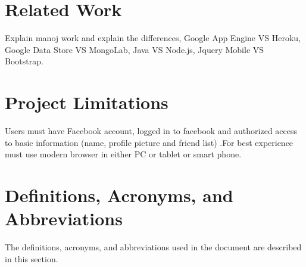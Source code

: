 \section{Related Work}
Explain manoj work and explain the differences, Google App Engine VS Heroku, Google Data Store VS MongoLab, Java VS Node.js, Jquery Mobile VS Bootstrap. \cite{Manoj}

\section{Project Limitations}
Users must have Facebook account,  logged in to facebook and authorized access to basic information (name, profile picture and friend list) .For best experience must use modern browser in either PC or tablet or smart phone.    

\section{Definitions, Acronyms, and Abbreviations}

The definitions, acronyms, and abbreviations used in the document are described in this section.

